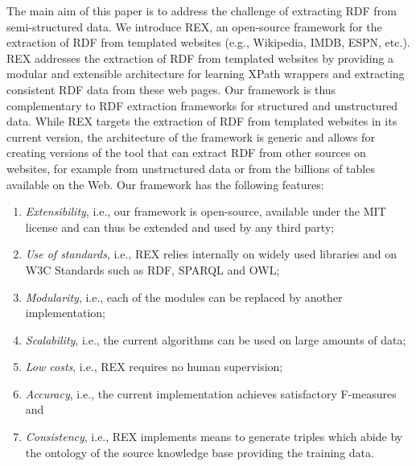 The main aim of this paper is to address the challenge of extracting RDF from semi-structured data.
We introduce REX, an open-source framework for the extraction of RDF from templated websites (e.g., Wikipedia, IMDB, ESPN, etc.).
REX addresses the extraction of RDF from templated websites by providing a modular and extensible architecture for learning XPath wrappers and extracting consistent RDF data from these web pages.
Our framework is thus complementary to RDF extraction frameworks for structured and unstructured data.
While REX targets the extraction of RDF from templated websites in its current version, the architecture of the framework is generic and allows for creating versions of the tool that can extract RDF from other sources on websites, for example from unstructured data or from the billions of tables available on the Web.
Our framework has the following features:
\begin{enumerate}
\item \emph{Extensibility}, i.e., our framework is open-source, available under the MIT license and can thus be extended and used by any third party;
\item \emph{Use of standards}, i.e., REX relies internally on widely used libraries and on W3C Standards such as RDF, SPARQL and OWL;
\item \emph{Modularity}, i.e., each of the modules can be replaced by another implementation;
\item \emph{Scalability}, i.e., the current algorithms can be used on large amounts of data; 
\item \emph{Low costs}, i.e., REX requires no human supervision; 
\item \emph{Accuracy}, i.e., the current implementation achieves satisfactory F-measures 
and
\item \emph{Consistency}, i.e., REX implements means to generate triples which abide by the ontology of the source knowledge base providing the training data.
\end{enumerate}

